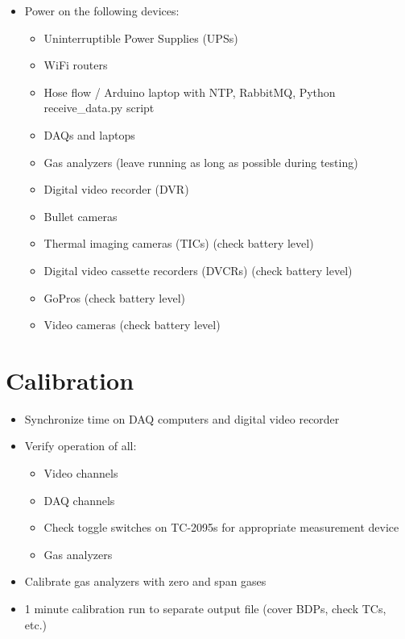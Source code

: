\documentclass[11pt,oneside]{book}
\begin{document}
\begin{itemize}
\item Power on the following devices:
    \begin{itemize}
    \item Uninterruptible Power Supplies (UPSs)
    \item WiFi routers
    \item Hose flow / Arduino laptop with NTP, RabbitMQ, Python receive\_data.py script
    \item DAQs and laptops
    \item Gas analyzers (leave running as long as possible during testing)
    \item Digital video recorder (DVR)
    \item Bullet cameras
    \item Thermal imaging cameras (TICs) (check battery level)
    \item Digital video cassette recorders (DVCRs) (check battery level)
    \item GoPros (check battery level)
    \item Video cameras (check battery level)
    \end{itemize}
\end{itemize}

\section{Calibration}

\begin{itemize}
\item Synchronize time on DAQ computers and digital video recorder

\item Verify operation of all:
    \begin{itemize}
    \item Video channels
    \item DAQ channels
    \item Check toggle switches on TC-2095s for appropriate measurement device
    \item Gas analyzers
    \end{itemize}

\item Calibrate gas analyzers with zero and span gases

\item 1 minute calibration run to separate output file (cover BDPs, check TCs, etc.)

\end{itemize}
\end{document}
